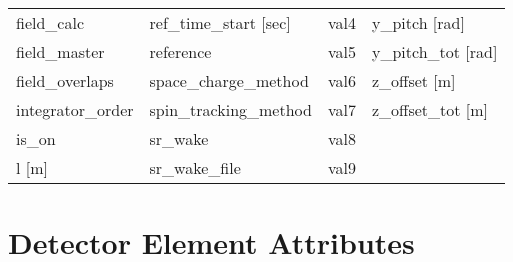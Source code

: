 \begin{tabular}{llll}
field_calc                       & ref_time_start [sec]             & val4                             & y_pitch [rad]                    \\
field_master                     & reference                        & val5                             & y_pitch_tot [rad]                \\
field_overlaps                   & space_charge_method              & val6                             & z_offset [m]                     \\
integrator_order                 & spin_tracking_method             & val7                             & z_offset_tot [m]                 \\
is_on                            & sr_wake                          & val8                             &                                  \\
l [m]                            & sr_wake_file                     & val9                             &                                  \\
 \bottomrule
 \end{tabular}
 \vfill
 
 \section{Detector Element Attributes}
 \label{s:list.detector}
 
